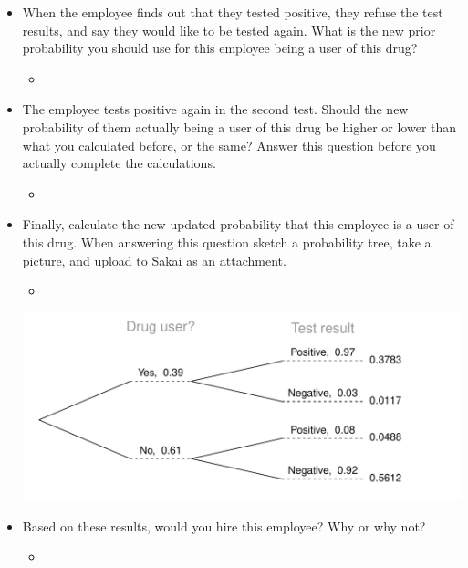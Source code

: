 \documentclass[slidestop,compress,mathserif,11pt,t,professionalfonts,xcolor=table]{beamer}
\begin{document}
\begin{frame}
\begin{itemize}

\item When the employee finds out that they tested positive, they refuse the test results, and say they would like to be tested again. What is the new prior probability you should use for this employee being a user of this drug? \pause

\begin{itemize}
\item {} \pause
\end{itemize}

\item The employee tests positive again in the second test. Should the new probability of them actually being a user of this drug be higher or lower than what you calculated before, or the same? Answer this question before you actually complete the calculations. \pause
\begin{itemize}
\item {}
\end{itemize}
\end{itemize}
\end{frame}

\begin{frame}
\begin{itemize}
\item Finally, calculate the new updated probability that this employee is a user of this drug. When answering this question sketch a probability tree, take a picture, and upload to Sakai as an attachment.
\begin{itemize}

\item {} \pause

\end{itemize}
\includegraphics[width = \textwidth]{figures/test2.pdf} \pause

\item Based on these results, would you hire this employee? Why or why not?

\begin{itemize}
\item{}
\end{itemize}
\end{itemize}

\end{frame}
\end{document}

